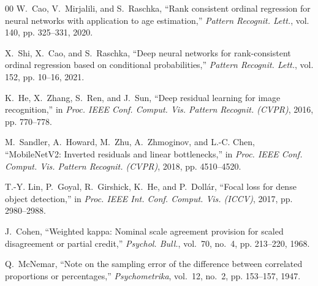 \documentclass[conference]{IEEEtran}
\begin{document}
\begin{thebibliography}{00}
W.~Cao, V.~Mirjalili, and S.~Raschka, ``Rank consistent ordinal regression for neural networks with application to age estimation,'' \emph{Pattern Recognit. Lett.}, vol. 140, pp. 325--331, 2020.

X.~Shi, X.~Cao, and S.~Raschka, ``Deep neural networks for rank-consistent ordinal regression based on conditional probabilities,'' \emph{Pattern Recognit. Lett.}, vol. 152, pp. 10--16, 2021.

K.~He, X.~Zhang, S.~Ren, and J.~Sun, ``Deep residual learning for image recognition,'' in \emph{Proc. IEEE Conf. Comput. Vis. Pattern Recognit. (CVPR)}, 2016, pp. 770--778.

M.~Sandler, A.~Howard, M.~Zhu, A.~Zhmoginov, and L.-C. Chen, ``MobileNetV2: Inverted residuals and linear bottlenecks,'' in \emph{Proc. IEEE Conf. Comput. Vis. Pattern Recognit. (CVPR)}, 2018, pp. 4510--4520.

T.-Y. Lin, P.~Goyal, R.~Girshick, K.~He, and P.~Doll{\'a}r, ``Focal loss for dense object detection,'' in \emph{Proc. IEEE Int. Conf. Comput. Vis. (ICCV)}, 2017, pp. 2980--2988.

J.~Cohen, ``Weighted kappa: Nominal scale agreement provision for scaled disagreement or partial credit,'' \emph{Psychol. Bull.}, vol.~70, no.~4, pp. 213--220, 1968.

Q.~McNemar, ``Note on the sampling error of the difference between correlated proportions or percentages,'' \emph{Psychometrika}, vol.~12, no.~2, pp. 153--157, 1947.
\end{thebibliography}
\end{document}

